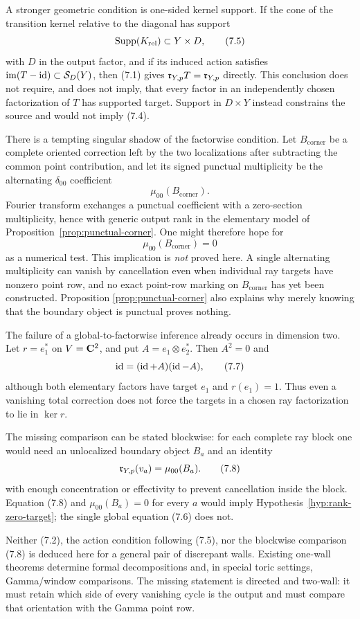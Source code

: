 A stronger geometric condition is one-sided kernel support.  If the cone of
the transition kernel relative to the diagonal has support
\[
 \operatorname{Supp}(K_{\mathrm{rel}})\subset Y\times D,                    \tag{7.5}
\]
with \(D\) in the output factor, and if its induced action satisfies
\(\operatorname{im}(T-\operatorname{id})\subset\mathcal S_D(Y)\), then (7.1) gives
\(\mathfrak r_{Y,p}T=\mathfrak r_{Y,p}\) directly.  This conclusion does not require, and
does not imply, that every factor in an independently chosen factorization
of \(T\) has supported target.  Support in \(D\times Y\) instead constrains
the source and would not imply (7.4).

There is a tempting singular shadow of the factorwise condition.  Let
\(B_{\mathrm{corner}}\) be a complete oriented correction left by the two
localizations after subtracting the common point contribution, and let its
signed punctual multiplicity be the alternating \(\delta_{00}\) coefficient
\[
 \mu_{00}(B_{\mathrm{corner}}).
\]
Fourier transform exchanges a punctual coefficient with a zero-section
multiplicity, hence with generic output rank in the elementary model of
Proposition~\ref{prop:punctual-corner}.  One might therefore hope for
\[
 \mu_{00}(B_{\mathrm{corner}})=0                              \tag{7.6}
\]
as a numerical test.  This implication is \emph{not} proved here.  A single
alternating multiplicity can vanish by cancellation even when individual
ray targets have nonzero point row, and no exact point-row marking on
\(B_{\mathrm{corner}}\) has yet been constructed.  Proposition
\ref{prop:punctual-corner} also explains why merely knowing that the boundary
object is punctual proves nothing.

The failure of a global-to-factorwise inference already occurs in dimension
two.  Let \(r=e_1^*\) on \(V=\mathbf C^2\), and put
\(A=e_1\otimes e_2^*\).  Then \(A^2=0\) and
\[
 \operatorname{id}=(\operatorname{id}+A)(\operatorname{id}-A),                                      \tag{7.7}
\]
although both elementary factors have target \(e_1\) and
\(r(e_1)=1\).  Thus even a vanishing total correction does not force the
targets in a chosen ray factorization to lie in \(\ker r\).

The missing comparison can be stated blockwise: for each complete ray block
one would need an unlocalized boundary object \(B_a\) and an identity
\[
 \mathfrak r_{Y,p}(v_a)=\mu_{00}(B_a).                              \tag{7.8}
 \label{eq:blockwise-boundary-marking}
\]
with enough concentration or effectivity to prevent cancellation inside the
block.  Equation (7.8) and \(\mu_{00}(B_a)=0\) for every \(a\) would imply
Hypothesis~\ref{hyp:rank-zero-target}; the single global equation (7.6) does
not.

\begin{remark}
Neither (7.2), the action condition following (7.5), nor the blockwise
comparison (7.8) is deduced here for a general pair of discrepant walls.
Existing one-wall theorems determine formal decompositions and, in special
toric settings, Gamma/window comparisons.  The missing statement is directed
and two-wall: it must retain which side of every vanishing cycle is the
output and must compare that orientation with the Gamma point row.
\end{remark}
